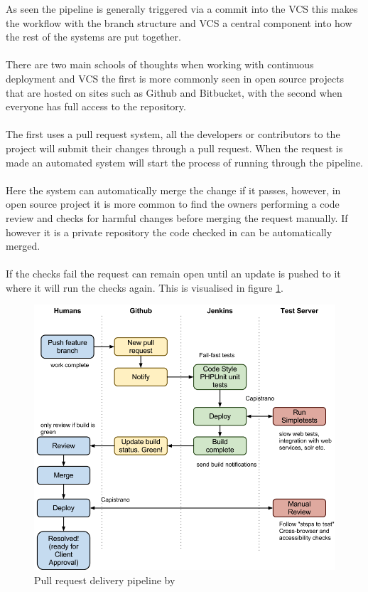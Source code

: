 As seen the pipeline is generally triggered via a commit into the VCS this makes the workflow with the branch structure and VCS a central component into how the rest of the systems are put together.
\\\\
There are two main schools of thoughts when working with continuous deployment and VCS the first is more commonly seen in open source projects that are hosted on sites such as Github and Bitbucket, with the second when everyone has full access to the repository. 
\\\\
The first uses a pull request system, all the developers or contributors to the project will submit their changes through a pull request. When the request is made an automated system will start the process of running through the pipeline. 
\\\\
Here the system can automatically merge the change if it passes, however, in open source project it is more common to find the owners performing a code review and checks for harmful changes before merging the request manually. If however it is a private repository the code checked in can be automatically merged. 
\\\\
If the checks fail the request can remain open until an update is pushed to it where it will run the checks again. This is visualised in figure \ref{fig:osspipeline}.

\begin{figure}[H]
	\centering
	\includegraphics[scale=0.4]{images/osspipeline.png}
	\caption{Pull request delivery pipeline by \cite{osspipeline}}
	\label{fig:osspipeline}
\end{figure}

